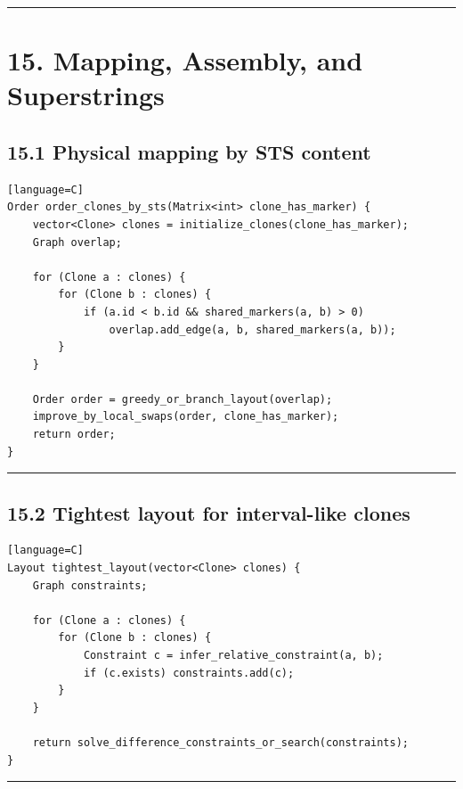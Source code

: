 \documentclass[11pt]{article}
\begin{document}
\begin{center}\rule{0.5\linewidth}{0.5pt}\end{center}

\section{15. Mapping, Assembly, and Superstrings}\label{mapping-assembly-and-superstrings}

\subsection{15.1 Physical mapping by STS content}\label{physical-mapping-by-sts-content}

\begin{verbatim}[language=C]
Order order_clones_by_sts(Matrix<int> clone_has_marker) {
    vector<Clone> clones = initialize_clones(clone_has_marker);
    Graph overlap;

    for (Clone a : clones) {
        for (Clone b : clones) {
            if (a.id < b.id && shared_markers(a, b) > 0)
                overlap.add_edge(a, b, shared_markers(a, b));
        }
    }

    Order order = greedy_or_branch_layout(overlap);
    improve_by_local_swaps(order, clone_has_marker);
    return order;
}
\end{verbatim}

\begin{center}\rule{0.5\linewidth}{0.5pt}\end{center}

\subsection{15.2 Tightest layout for interval-like clones}\label{tightest-layout-for-interval-like-clones}

\begin{verbatim}[language=C]
Layout tightest_layout(vector<Clone> clones) {
    Graph constraints;

    for (Clone a : clones) {
        for (Clone b : clones) {
            Constraint c = infer_relative_constraint(a, b);
            if (c.exists) constraints.add(c);
        }
    }

    return solve_difference_constraints_or_search(constraints);
}
\end{verbatim}

\begin{center}\rule{0.5\linewidth}{0.5pt}\end{center}
\end{document}
